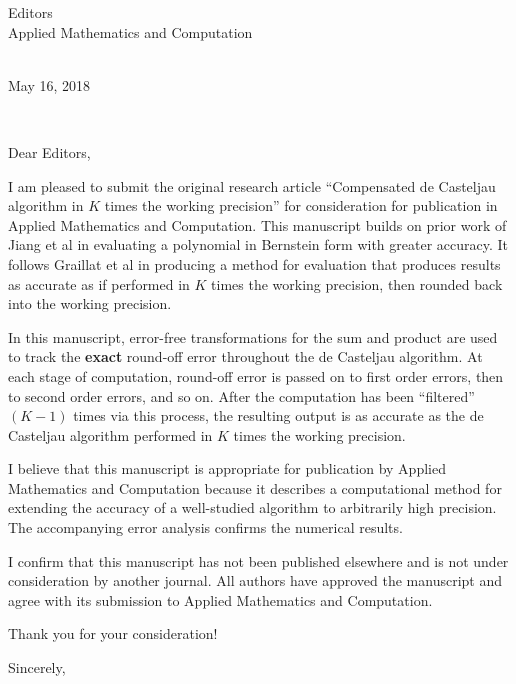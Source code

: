 \documentclass[11pt,a4paper]{letter}
\def\opening#1{\thispagestyle{empty}
{\centering\fromaddress \vspace{0.6in} \\ %
\hspace*{\longindentation}May 16, 2018\hspace*{\fill}\par}  %
{\raggedright \toname \\ \toaddress \par} %
\vspace{0.4in} %
\noindent #1 %
}
\begin{document}
\begin{letter}
{Editors \\
Applied Mathematics and Computation}

\opening{Dear Editors,}

I am pleased to submit the original research article
``Compensated de Casteljau algorithm in \(K\) times the working precision''
for consideration for publication in Applied Mathematics and Computation.
This manuscript builds on prior work of Jiang et al in evaluating a polynomial
in Bernstein form with greater accuracy. It follows Graillat et al in
producing a method for evaluation that produces results as accurate as if
performed in \(K\) times the working precision, then rounded back into the
working precision.

In this manuscript, error-free transformations for the sum and product
are used to track the \textbf{exact} round-off error throughout the
de Casteljau algorithm. At each stage of computation, round-off error is
passed on to first order errors, then to second order errors, and so on.
After the computation has been ``filtered'' \((K - 1)\) times via this
process, the resulting output is as accurate as the de Casteljau algorithm
performed in \(K\) times the working precision.

I believe that this manuscript is appropriate for publication by
Applied Mathematics and Computation because it describes a computational
method for extending the accuracy of a well-studied algorithm to
arbitrarily high precision. The accompanying error analysis confirms
the numerical results.

I confirm that this manuscript has not been published elsewhere and is not
under consideration by another journal. All authors have approved the
manuscript and agree with its submission to Applied Mathematics and
Computation.

Thank you for your consideration!

\closing{Sincerely,}

\end{letter}
\end{document}
